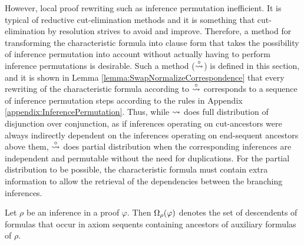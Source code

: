 \noindent
However, local proof rewriting such as inference permutation inefficient. It is typical of reductive cut-elimination methods and it is something that cut-elimination by resolution strives to avoid and improve. Therefore, a method for transforming the characteristic formula into clause form that takes the possibility of inference permutation into account without actually having to perform inference permutations is desirable. Such a method ($\stackrel{\circ}{\leadsto}$) is defined in this section, and it is shown in Lemma \ref{lemma:SwapNormalizeCorrespondence} that every rewriting of the characteristic formula according to $\stackrel{\circ}{\leadsto}$ corresponds to a sequence of inference permutation steps according to the rules in Appendix \ref{appendix:InferencePermutation}. Thus, while $\leadsto$ does full distribution of disjunction over conjunction, as if inferences operating on cut-ancestors were always indirectly dependent on the inferences operating on end-sequent ancestors above them, $\stackrel{\circ}{\leadsto}$ does partial distribution when the corresponding inferences are independent and permutable without the need for duplications. For the partial distribution to be possible, the characteristic formula must contain extra information to allow the retrieval of the dependencies between the branching inferences.



\begin{definition}
\label{definition:InferenceOccurrences}
Let $\rho$ be an inference in a proof $\varphi$. Then
$
\Omega_{\rho}(\varphi)
$
denotes the set of descendents of formulas that occur in axiom sequents containing ancestors of auxiliary formulas of $\rho$.
\end{definition}


\newcommand{\marked}[1]{#1^*}

